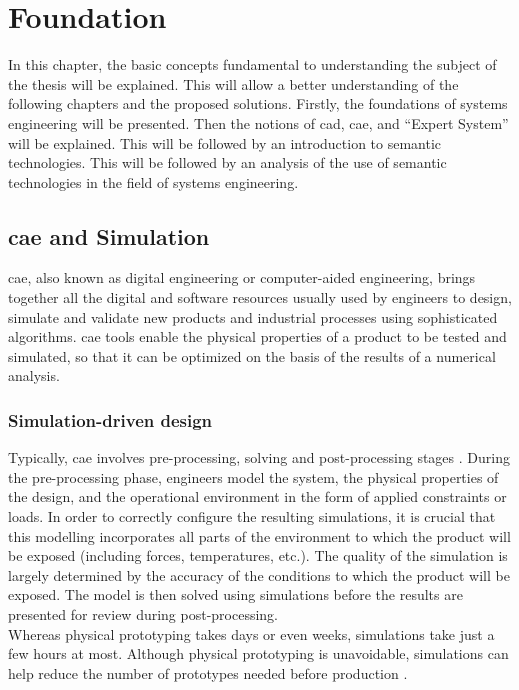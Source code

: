 \section{Foundation\label{sec:foundation}}
In this chapter, the basic concepts fundamental to understanding the subject of the thesis will be explained. This will allow a better understanding of the following chapters and the proposed solutions. Firstly, the foundations of systems engineering will be presented. Then the notions of \acrshort{cad}, \acrshort{cae}, and “Expert System” will be explained. This will be followed by an introduction to semantic technologies. This will be followed by an analysis of the use of semantic technologies in the field of systems engineering. 



\subsection{\acrlong{cae} and Simulation}
\acrfull{cae}, also known as digital engineering or computer-aided engineering, brings together all the digital and software resources usually used by engineers to design, simulate and validate new products and industrial processes using sophisticated algorithms. \acrshort{cae} tools enable the physical properties of a product to be tested and simulated, so that it can be optimized on the basis of the results of a numerical analysis.

    \subsubsection{Simulation-driven design}
    Typically, \acrshort{cae} involves pre-processing, solving and post-processing stages \cite{karlberg2013state}. During the pre-processing phase, engineers model the system, the physical properties of the design, and the operational environment in the form of applied constraints or loads. In order to correctly configure the resulting simulations, it is crucial that this modelling incorporates all parts of the environment to which the product will be exposed (including forces, temperatures, etc.).  The quality of the simulation is largely determined by the accuracy of the conditions to which the product will be exposed. The model is then solved using simulations before the results are presented for review during post-processing. \\

    Whereas physical prototyping takes days or even weeks, simulations take just a few hours at most. Although physical prototyping is unavoidable, simulations can help reduce the number of prototypes needed before production \cite{sellgren1999simulation}.\\
    
